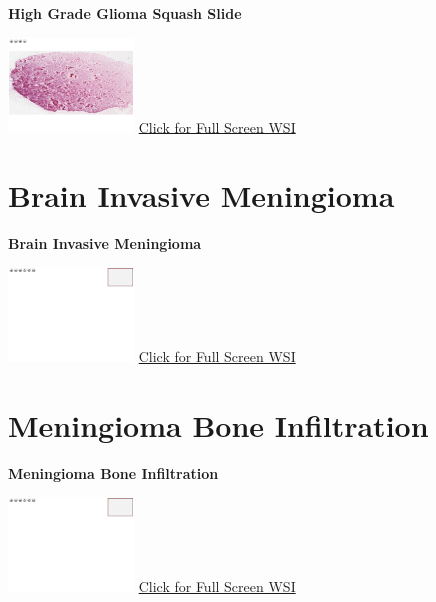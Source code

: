 \documentclass[
  letterpaper,
  paper=6in:9in,
  pagesize=pdftex,
  headinclude=on,
  footinclude=on,
  12pt]{scrbook}
\begin{document}
\textbf{High Grade Glioma Squash Slide}

\href{https://images.patolojiatlasi.com/high-grade-glioma-squash/HE.html}{\includegraphics[width=0.25\textwidth,height=\textheight]{./screenshots/high-grade-glioma-squash_screenshot.png}}
\href{https://images.patolojiatlasi.com/high-grade-glioma-squash/HE.html}{Click
for Full Screen WSI}

\hypertarget{sec-brain-invasive-meningioma}{%
\chapter{Brain Invasive
Meningioma}\label{sec-brain-invasive-meningioma}}

\textbf{Brain Invasive Meningioma}

\href{https://images.patolojiatlasi.com/template/HE.html}{\includegraphics[width=0.25\textwidth,height=\textheight]{./screenshots/template_screenshot.png}}
\href{https://images.patolojiatlasi.com/brain-invasive-meningioma/HE.html}{Click
for Full Screen WSI}

\hypertarget{sec-meningioma-invading-bone}{%
\chapter{Meningioma Bone
Infiltration}\label{sec-meningioma-invading-bone}}

\textbf{Meningioma Bone Infiltration}

\href{https://images.patolojiatlasi.com/template/HE.html}{\includegraphics[width=0.25\textwidth,height=\textheight]{./screenshots/template_screenshot.png}}
\href{https://images.patolojiatlasi.com/meningioma-bone-infiltration/HE.html}{Click
for Full Screen WSI}
\end{document}
